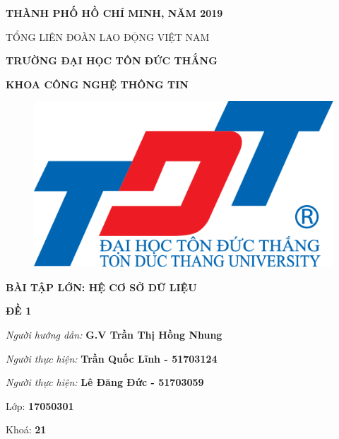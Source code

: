\documentclass{report}
\begin{document}
\vspace{1cm}
\changefontsizes{14pt}
\centerline{\textbf{THÀNH PHỐ HỒ CHÍ MINH, NĂM 2019}}


\newpage
\changefontsizes[14pt]{12pt}
\centerline{TỔNG LIÊN ĐOÀN LAO ĐỘNG VIỆT NAM}

\changefontsizes[14pt]{11pt}
\centerline{\textbf{TRƯỜNG ĐẠI HỌC TÔN ĐỨC THẮNG}}
\centerline{\textbf{KHOA CÔNG NGHỆ THÔNG TIN}}

\begin{center}
    \begin{figure}[htp]
    \begin{center}
     \includegraphics[scale=.2]{logo}
    \end{center}
    \end{figure}
\end{center}

\changefontsizes{16pt}
\centerline{\textbf{BÀI TẬP LỚN: HỆ CƠ SỞ DỮ LIỆU}}
\vspace{1.5cm}
\changefontsizes{24pt}
\centerline{\textbf{ĐỀ 1}}

\vspace{4cm}
\begin{flushright}
\renewcommand{\baselinestretch}{0.05}
\changefontsizes{14pt}
\textit{Người hướng dẫn: }\textbf{G.V Trần Thị Hồng Nhung}
\setlength{\parskip}{0.5em}

\textit{Người thực hiện: }\textbf{Trần Quốc Lĩnh - 51703124}
\setlength{\parskip}{0.5em}

\textit{Người thực hiện: }\textbf{Lê Đăng Đức - 51703059}
\setlength{\parskip}{0.5em}

Lớp: \textbf{17050301}
\setlength{\parskip}{0.5em}

Khoá: \textbf{21}
\setlength{\parskip}{0.5em}

\end{flushright}
\end{document}
